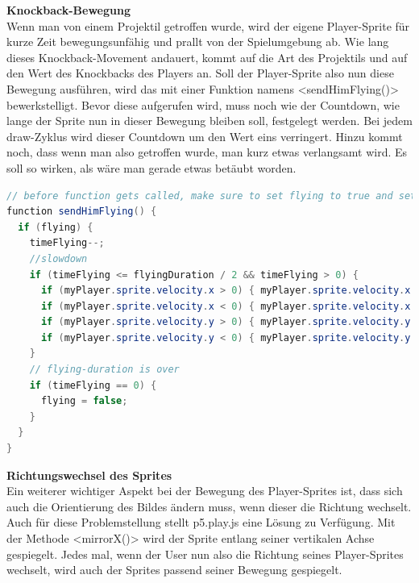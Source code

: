 \textbf{Knockback-Bewegung} \\
Wenn man von einem Projektil getroffen wurde, wird der eigene Player-Sprite für kurze Zeit bewegungsunfähig und prallt von der Spielumgebung ab.
Wie lang dieses Knockback-Movement andauert, kommt auf die Art des Projektils und auf den Wert des Knockbacks des Players an.
Soll der Player-Sprite also nun diese Bewegung ausführen, wird das mit einer Funktion namens <sendHimFlying()> bewerkstelligt.
Bevor diese aufgerufen wird, muss noch wie der Countdown, wie lange der Sprite nun in dieser Bewegung bleiben soll, festgelegt werden. Bei jedem draw-Zyklus wird dieser Countdown um den Wert eins verringert.
Hinzu kommt noch, dass wenn man also getroffen wurde, man kurz etwas verlangsamt wird. Es soll so wirken, als wäre man gerade etwas betäubt worden.
\begin{lstlisting}[caption=Knockback-Bewegung,language=Java,label=lst:impl:knockbackMov]
// before function gets called, make sure to set flying to true and set a flying-duration
function sendHimFlying() {
  if (flying) {
    timeFlying--;
    //slowdown 
    if (timeFlying <= flyingDuration / 2 && timeFlying > 0) {
      if (myPlayer.sprite.velocity.x > 0) { myPlayer.sprite.velocity.x -= 0.3; }
      if (myPlayer.sprite.velocity.x < 0) { myPlayer.sprite.velocity.x += 0.3; }
      if (myPlayer.sprite.velocity.y > 0) { myPlayer.sprite.velocity.y -= 0.3; }
      if (myPlayer.sprite.velocity.y < 0) { myPlayer.sprite.velocity.y += 0.3; }
    }
    // flying-duration is over
    if (timeFlying == 0) {
      flying = false;
    }
  }
}
\end{lstlisting}


\textbf{Richtungswechsel des Sprites} \label{directionChange}
\\
Ein weiterer wichtiger Aspekt bei der Bewegung des Player-Sprites ist, dass sich auch die Orientierung des Bildes ändern muss, wenn dieser die Richtung wechselt.
Auch für diese Problemstellung stellt p5.play.js eine Lösung zu Verfügung. Mit der Methode <mirrorX()> wird der Sprite entlang seiner vertikalen Achse gespiegelt.
Jedes mal, wenn der User nun also die Richtung seines Player-Sprites wechselt, wird auch der Sprites passend seiner Bewegung gespiegelt.

